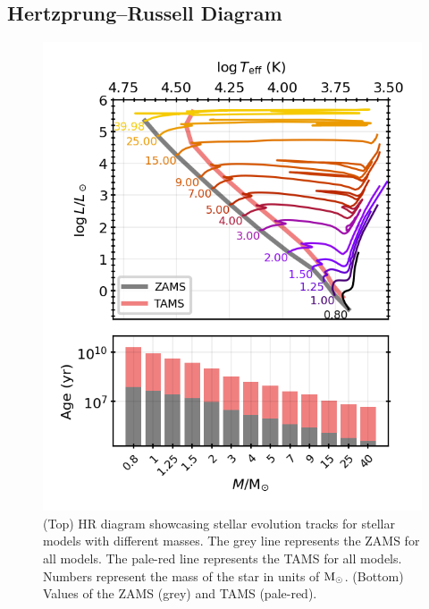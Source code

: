 

\subsection{Hertzprung--Russell Diagram}

\begin{figure}[!ht]
    \centering
    \includegraphics[width=1.0\columnwidth]{../figures/HR_plot.png}  %
    \caption{\small (Top) HR diagram showcasing stellar evolution tracks for stellar models with different masses. The grey line represents the ZAMS for all models. The pale-red line represents the TAMS for all models. Numbers represent the mass of the star in units of ${\rm M}_\odot$. (Bottom) Values of the ZAMS (grey) and TAMS (pale-red).}
    \label{fig:HR_plot}
\end{figure}



